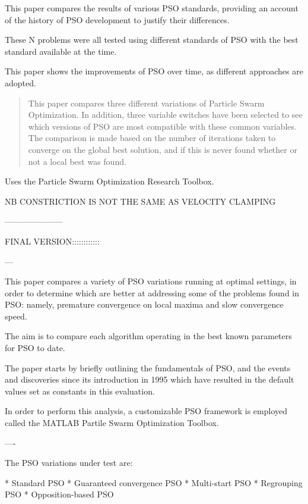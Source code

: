 This paper compares the results of various PSO standards, providing an
account of the history of PSO development to justify their differences.

These N problems were all tested using different standards of PSO with the best
standard available at the time.


This paper shows the improvements of PSO over time, as different approaches are
adopted.

\begin{abstract}
This paper compares three different variations of Particle Swarm Optimization.
In addition, three variable switches have been selected to see which versions
of PSO are most compatible with these common variables. The comparison is made
based on the number of iterations taken to converge on the global best
solution, and if this is never found whether or not a local best was found. 
\end{abstract}

Uses the Particle Swarm Optimization Research Toolbox.

NB CONSTRICTION IS NOT THE SAME AS VELOCITY CLAMPING


---------------------

FINAL VERSION::::::::::::

---

This paper compares a variety of PSO variations running at optimal settings, in
order to determine which are better at addressing some of the problems found in
PSO: namely, premature convergence on local maxima and slow convergence speed.

The aim is to compare each algorithm operating in the best known parameters for
PSO to date.

The paper starts by briefly outlining the fundamentals of PSO, and the events
and discoveries since its introduction in 1995 which have resulted in the
default values set as constants in this evaluation.

In order to perform this analysis, a customizable PSO framework is employed
called the MATLAB Partile Swarm Optimization Toolbox.

----

The PSO variations under test are:

* Standard PSO
* Guaranteed convergence PSO
* Multi-start PSO
* Regrouping PSO
* Opposition-based PSO

